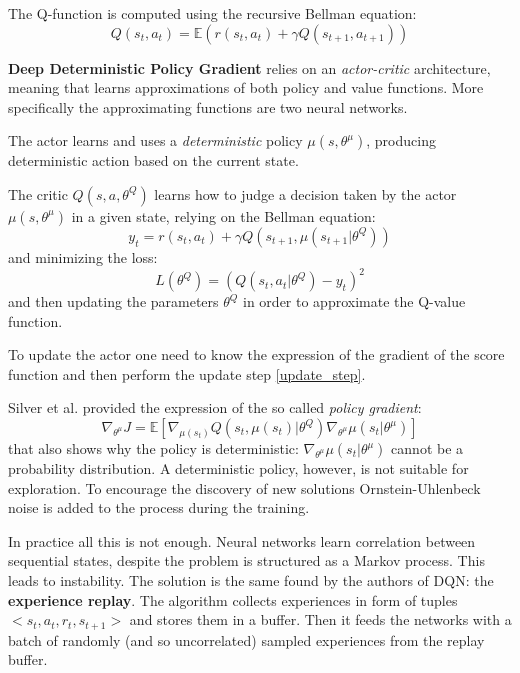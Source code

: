 \documentclass[10pt,a4paper]{scrartcl}
\begin{document}
The Q-function is computed using the recursive Bellman equation:
\begin{equation}
	Q(s_t,a_t) = \mathbb{E}(r(s_t, a_t) + \gamma Q(s_{t+1}, a_{t+1}))
\end{equation}

\textbf{Deep Deterministic Policy Gradient} relies on an \textit{actor-critic} architecture, meaning that learns approximations of both policy and value functions. More specifically the approximating functions are two neural networks.

The actor learns and uses a \textit{deterministic} policy $ \mu(s,\theta^\mu) $, producing deterministic action based on the current state.

The critic $ Q(s,a,\theta^Q) $ learns how to judge a decision taken by the actor $ \mu(s, \theta^\mu) $ in a given state, relying on the Bellman equation:
\begin{equation}
	y_t = r(s_t, a_t) + \gamma Q (s_{t+1}, \mu(s_{t+1}| \theta^Q))
\end{equation}
and minimizing the loss:
\begin{equation}
	L(\theta^Q) = (Q(s_t,a_t|\theta^Q) - y_t)^2
\end{equation}
and then updating the parameters $ \theta^Q $ in order to approximate the Q-value function.

To update the actor one need to know the expression of the gradient of the score function and then perform the update step \eqref{update_step}.

Silver et al. \cite{silver2014deterministic} provided the expression of the so called \textit{policy gradient}:
\begin{equation}
	\nabla_{\theta^\mu} J = \mathbb{E}[\nabla_{\mu(s_t)}Q(s_t,\mu(s_t)|\theta^Q) \nabla_{\theta^\mu}\mu(s_t|\theta^\mu)]
\end{equation}
that also shows why the policy is deterministic: $ \nabla_{\theta^\mu}\mu(s_t|\theta^\mu) $ cannot be a probability distribution. A deterministic policy, however, is not suitable for exploration. To encourage the discovery of new solutions Ornstein-Uhlenbeck noise is added to the process during the training.

In practice all this is not enough. Neural networks learn correlation between sequential states, despite the problem is structured as a Markov process. This leads to instability. The solution is the same found by the authors of DQN: the \textbf{experience replay}. The algorithm collects experiences in form of tuples $ <s_t, a_t, r_t, s_{t+1}> $ and stores them in a buffer. Then it feeds the networks with a batch of randomly (and so uncorrelated) sampled experiences from the replay buffer.
\end{document}
